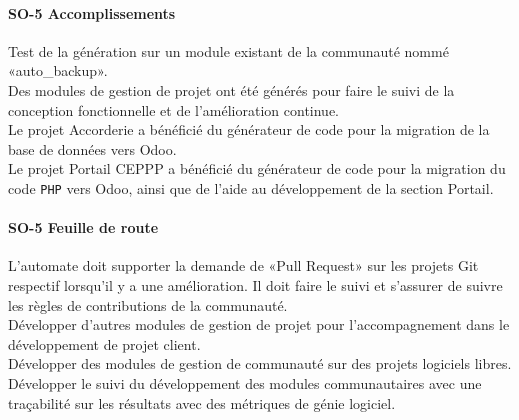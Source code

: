 \paragraph{SO-5 Accomplissements}
Test de la génération sur un module existant de la communauté nommé «auto\_backup».\\
Des modules de gestion de projet ont été générés pour faire le suivi de la conception fonctionnelle et de l’amélioration continue.\\
Le projet Accorderie a bénéficié du générateur de code pour la migration de la base de données vers Odoo.\\
Le projet Portail CEPPP a bénéficié du générateur de code pour la migration du code \texttt{PHP} vers Odoo, ainsi que de l’aide au développement de la section Portail.

\paragraph{SO-5 Feuille de route}
L’automate doit supporter la demande de «Pull Request» sur les projets Git respectif lorsqu’il y a une amélioration. Il doit faire le suivi et s’assurer de suivre les règles de contributions de la communauté.\\
Développer d’autres modules de gestion de projet pour l’accompagnement dans le développement de projet client.\\
Développer des modules de gestion de communauté sur des projets logiciels libres.\\
Développer le suivi du développement des modules communautaires avec une traçabilité sur les résultats avec des métriques de génie logiciel.




